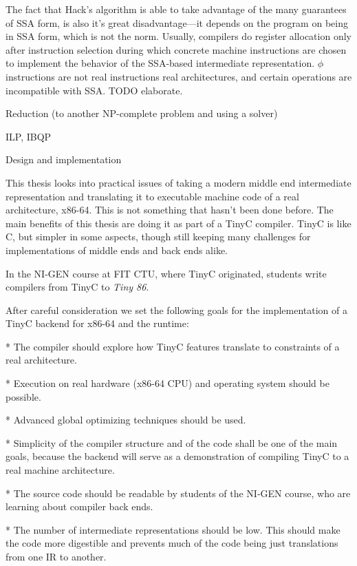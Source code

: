The fact that Hack's algorithm is able to take advantage of the many guarantees
of SSA form, is also it's great disadvantage---it depends on the program on
being in SSA form, which is not the norm. Usually, compilers do register
allocation only after instruction selection during which concrete machine
instructions are chosen to implement the behavior of the SSA-based intermediate
representation. $\phi$ instructions are not real instructions real
architectures, and certain operations are incompatible with SSA. TODO elaborate.

\seccc Reduction (to another NP-complete problem and using a solver)

ILP, IBQP

\chap Design and implementation

This thesis looks into practical issues of taking a modern middle end
intermediate representation and translating it to executable machine code of a
real architecture, x86-64. This is not something that hasn't been done before.
The main benefits of this thesis are doing it as part of a TinyC compiler. TinyC
is like C, but simpler in some aspects, though still keeping many challenges for
implementations of middle ends and back ends alike.

In the NI-GEN course at FIT CTU, where TinyC originated, students write
compilers from TinyC to {\em Tiny 86}.

After careful consideration we set the following goals for the implementation of
a TinyC backend for x86-64 and the runtime:

\begitems

* The compiler should explore how TinyC features translate to constraints of a
real architecture.

* Execution on real hardware (x86-64 CPU) and operating system should be
possible.

* Advanced global optimizing techniques should be used.

* Simplicity of the compiler structure and of the code shall be one of the main
goals, because the backend will serve as a demonstration of compiling TinyC to a
real machine architecture.

* The source code should be readable by students of the NI-GEN course, who are
learning about compiler back ends.

* The number of intermediate representations should be low. This should make the
code more digestible and prevents much of the code being just translations from
one IR to another.

